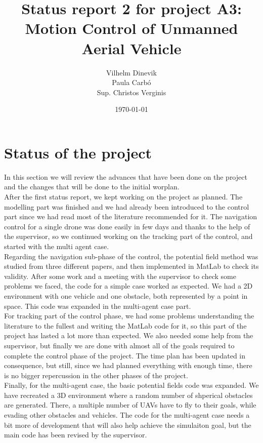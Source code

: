 \documentclass{article}
\title{Status report 2 for project A3: Motion Control of Unmanned Aerial Vehicle}
\author{Vilhelm Dinevik \\ Paula Carbó \\ Sup. Christos Verginis}
\date{\today}
\begin{document}
	\maketitle
	
	\bigskip
	\tableofcontents
	\newpage
\section{Status of the project}
In this section we will review the advances that have been done on the project and the changes that will be done to the initial worplan.  \\

After the first status report, we kept working on the project as planned. The modelling part was finished and we had already been introduced to the control part since we had read most of the literature recommended for it. The navigation control for a single drone was done easily in few days and thanks to the help of the supervisor, so we continued working on the tracking part of the control, and started with the multi agent case. \\

Regarding the navigation sub-phase of the control, the potential field method was studied from three different papers, and then implemented in MatLab to check its validity. After some work and a meeting with the supervisor to check some problems we faced, the code for a simple case worked as expected. We had a 2D environment with one vehicle and one obstacle, both represented by a point in space. This code was expanded in the multi-agent case part. \\

For tracking part of the control phase, we had some problems understanding the literature to the fullest and writing the MatLab code for it, so this part of the project has lasted a lot more than expected. We also needed some help from the supervisor, but finally we are done with almost all of the goals required to complete the control phase of the project. The time plan has been updated in consequence, but still, since we had planned everything with enough time, there is no bigger repercussion in the other phases of the project. \\

Finally, for the multi-agent case, the basic potential fields code was expanded. We have recreated a 3D environment where a random number of shperical obstacles are generated. There, a multiple number of UAVs have to fly to their goals, while evading other obstacles and vehicles. The code for the multi-agent case needs a bit more of development that will also help achieve the simulaiton goal, but the main code has been revised by the supervisor. \\
\end{document}
